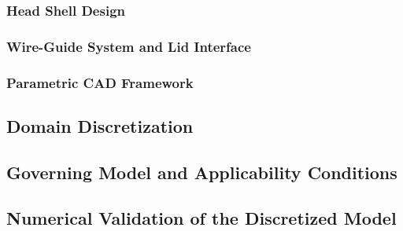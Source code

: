 \documentclass[../../00_Main/Main.tex]{subfiles}
\begin{document}
\subsubsection{Head Shell Design}
\label{subsec:head_shell}


\subsubsection{Wire-Guide System and Lid Interface}
\label{subsubsec:wire_guides}



\subsubsection{Parametric CAD Framework}
\label{subsubsec:cad_params}



\subsection{Domain Discretization}
\label{subsec:meshing}


\subsection{Governing Model and Applicability Conditions}
\label{subsec:pde}


\subsection{Numerical Validation of the Discretized Model}
\label{subsec:sphere_validation}


\label{subsec:phantom_head_transfer_model}


\biblio %
\end{document}
